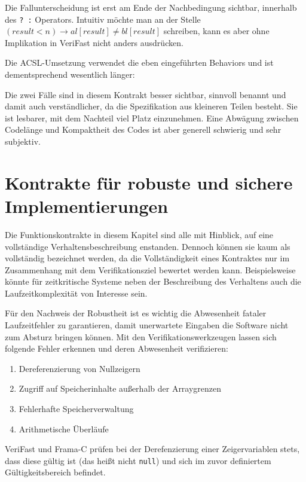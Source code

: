 Die Fallunterscheidung ist erst am Ende der Nachbedingung sichtbar, innerhalb des \lstinline{? :} Operators.
Intuitiv möchte man an der Stelle \((result < n) \rightarrow al[result] \neq  bl[result]\)
schreiben, kann es aber ohne Implikation in VeriFast nicht anders ausdrücken.

Die ACSL-Umsetzung verwendet die eben eingeführten Behaviors und ist dementsprechend wesentlich länger:


Die zwei Fälle sind in diesem Kontrakt besser sichtbar, sinnvoll benannt und damit auch verständlicher, 
da die Spezifikation aus kleineren Teilen besteht. Sie ist lesbarer, mit dem Nachteil viel Platz einzunehmen.
Eine Abwägung zwischen Codelänge und Kompaktheit des Codes ist aber generell schwierig und sehr subjektiv.


\section{Kontrakte für robuste und sichere Implementierungen}
\label{sec:design-by-contract:partielle-korrektheit}

Die Funktionskontrakte in diesem Kapitel sind alle mit Hinblick, auf eine vollständige Verhaltensbeschreibung
enstanden. Dennoch können sie kaum als vollständig bezeichnet werden, da die Vollständigkeit eines Kontraktes
nur im Zusammenhang mit dem Verifikationsziel bewertet werden kann. Beispielsweise könnte für zeitkritische
Systeme neben der Beschreibung des Verhaltens auch die Laufzeitkomplexität von Interesse sein.

Für den Nachweis der Robustheit ist es wichtig die Abwesenheit fataler Laufzeitfehler zu garantieren,
damit unerwartete Eingaben die Software nicht zum Absturz bringen können. Mit den Verifikationswerkzeugen lassen 
sich folgende Fehler erkennen und deren Abwesenheit verifizieren:
\begin{enumerate}
\item Dereferenzierung von Nullzeigern
\item Zugriff auf Speicherinhalte außerhalb der Arraygrenzen
\item Fehlerhafte Speicherverwaltung
\item Arithmetische Überläufe
\end{enumerate}

VeriFast und Frama-C prüfen bei der Derefenzierung einer Zeigervariablen stets, dass diese gültig ist (das heißt
nicht \texttt{null}) und sich im zuvor definiertem Gültigkeitsbereich befindet. 

